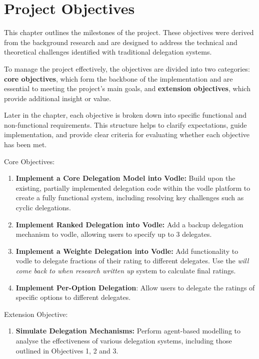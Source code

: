 \chapter{Project Objectives}
\label{ch:project_objectives}
This chapter outlines the milestones of the project. These objectives were derived from the background research and are designed to address the technical and theoretical challenges identified with traditional delegation systems.

To manage the project effectively, the objectives are divided into two categories: \textbf{core objectives}, which form the backbone of the implementation and are essential to meeting the project's main goals, and \textbf{extension objectives}, which provide additional insight or value. 

Later in the chapter, each objective is broken down into specific functional and non-functional requirements. This structure helps to clarify expectations, guide implementation, and provide clear criteria for evaluating whether each objective has been met.

Core Objectives:
\begin{enumerate}
    \item \textbf{Implement a Core Delegation Model into Vodle: } Build upon the existing, partially implemented delegation code within the vodle platform to create a fully functional system, including resolving key challenges such as cyclic delegations.

    \item \textbf{Implement Ranked Delegation into Vodle: } Add a backup delegation mechanism to vodle, allowing users to specify up to 3 delegates.

    \item \textbf{Implement a Weighte Delegation into Vodle: } Add functionality to vodle to delegate fractions of their rating to different delegates. Use the \textit{will come back to when research written up} system to calculate final ratings.

    \item \textbf{Implement Per-Option Delegation}: Allow users to delegate the ratings of specific options to different delegates.
\end{enumerate}

Extension Objective:
\begin{enumerate}
    \item \textbf{Simulate Delegation Mechanisms: } Perform agent-based modelling to analyse the effectiveness of various delegation systems, including those outlined in Objectives 1, 2 and 3.
\end{enumerate}

